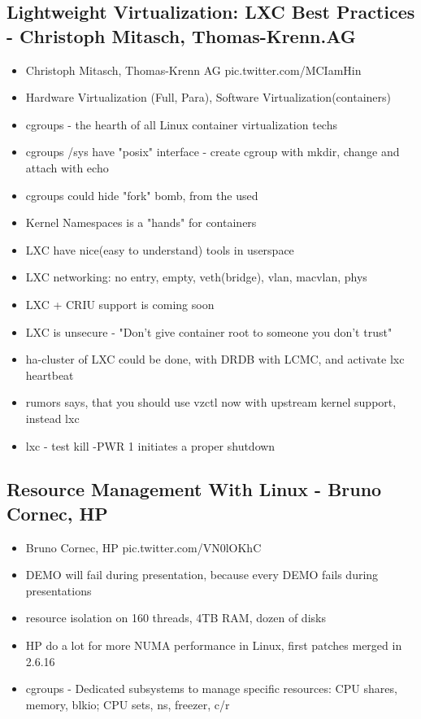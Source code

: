 \documentclass[10pt]{article}
\begin{document}
{\subsection{Lightweight Virtualization: LXC Best Practices - Christoph Mitasch, Thomas-Krenn.AG}
\begin{itemize}
\item Christoph Mitasch, Thomas-Krenn AG pic.twitter.com/MCIamHin
\item Hardware Virtualization (Full, Para), Software Virtualization(containers)
\item cgroups - the hearth of all Linux container virtualization techs
\item cgroups /sys have "posix" interface - create cgroup with mkdir, change and attach with echo
\item cgroups could hide "fork" bomb, from the used
\item Kernel Namespaces is a "hands" for containers
\item LXC have nice(easy to understand) tools in userspace
\item LXC networking: no entry, empty, veth(bridge), vlan, macvlan, phys
\item LXC + CRIU support is coming soon
\item LXC is unsecure - "Don't give container root to someone you don't trust"
\item ha-cluster of LXC could be done, with DRDB with LCMC, and activate lxc heartbeat
\item rumors says, that you should use vzctl now with upstream kernel support, instead lxc
\item lxc - test kill -PWR 1 initiates a proper shutdown
\end{itemize}

\subsection{Resource Management With Linux - Bruno Cornec, HP}
\begin{itemize}
\item Bruno Cornec, HP pic.twitter.com/VN0lOKhC
\item DEMO will fail during presentation, because every DEMO fails during presentations
\item resource isolation on 160 threads, 4TB RAM, dozen of disks
\item HP do a lot for more NUMA performance in Linux, first patches merged in 2.6.16
\item cgroups - Dedicated subsystems to manage specific resources: CPU shares, memory, blkio; CPU sets, ns, freezer, c/r
\end{itemize}

}
\end{document}
